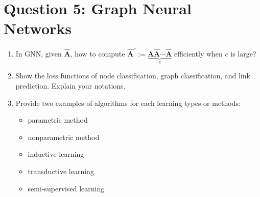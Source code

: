 \documentclass[
	12pt, %
]{fphw}
\begin{document}
\section*{Question 5: Graph Neural Networks}

\begin{problem}
\begin{enumerate}
	\item In GNN, given $\hat{\mathbf{A}}$, how to compute $\hat{\mathbf{A}}^c:=\underbrace{\hat{\mathbf{A}}\hat{\mathbf{A}}\cdots \hat{\mathbf{A}}}_c$ efficiently when $c$ is large? 
    
    \item Show the loss functions of node classification, graph classification, and link prediction. Explain your notations.
    
    \item Provide two examples of algorithms for each learning types or methods:
    \begin{itemize}
        \item parametric method
        \item nonparametric method
        \item inductive learning
        \item transductive learning
        \item semi-supervised learning
    \end{itemize}
\end{enumerate}

\end{problem}
\end{document}
